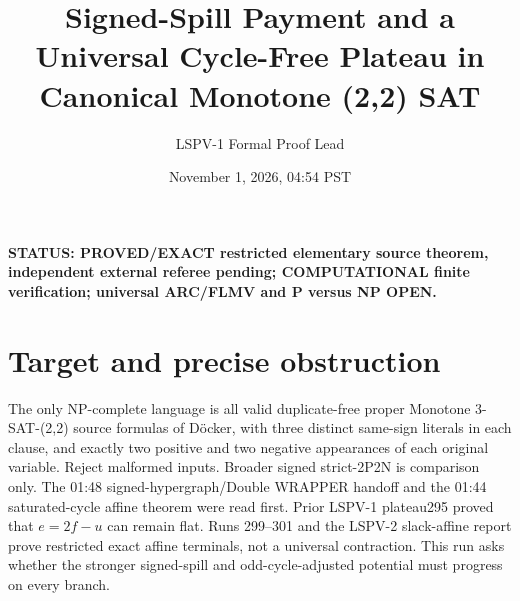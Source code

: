 \documentclass[11pt]{article}
\title{Signed-Spill Payment and a Universal Cycle-Free Plateau in Canonical Monotone (2,2) SAT}
\author{LSPV-1 Formal Proof Lead}
\date{November 1, 2026, 04:54 PST}
\begin{document}
\maketitle
\noindent\textbf{STATUS: PROVED/EXACT restricted elementary source theorem, independent external referee pending; COMPUTATIONAL finite verification; universal ARC/FLMV and P versus NP OPEN.}
\section{Target and precise obstruction}
The only NP-complete language is all valid duplicate-free proper Monotone 3-SAT-(2,2) source formulas of D\"ocker, with three distinct same-sign literals in each clause, and exactly two positive and two negative appearances of each original variable. Reject malformed inputs. Broader signed strict-2P2N is comparison only. The 01:48 signed-hypergraph/Double WRAPPER handoff and the 01:44 saturated-cycle affine theorem were read first. Prior LSPV-1 plateau295 proved that $e=2f-u$ can remain flat. Runs 299--301 and the LSPV-2 slack-affine report prove restricted exact affine terminals, not a universal contraction. This run asks whether the stronger signed-spill and odd-cycle-adjusted potential must progress on every branch.
\end{document}
